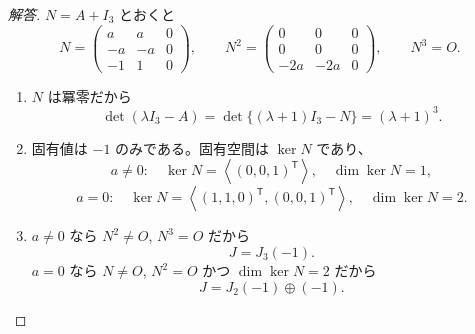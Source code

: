 \begin{proof}[解答]
$N=A+I_3$ とおくと
\[
N=\begin{pmatrix}a&a&0\\-a&-a&0\\-1&1&0\end{pmatrix},\qquad
N^2=\begin{pmatrix}0&0&0\\0&0&0\\-2a&-2a&0\end{pmatrix},\qquad
N^3=O.
\]
\begin{enumerate}
  \item[(1)] $N$ は冪零だから
  \[
  \det(\lambda I_3-A)=\det\{(\lambda+1)I_3-N\}=(\lambda+1)^3.
  \]

  \item[(2)] 固有値は $-1$ のみである。固有空間は $\ker N$ であり、
  \[
  a\ne0:\quad \ker N=\left\langle(0,0,1)^{\mathsf T}\right\rangle,
  \quad \dim\ker N=1,
  \]
  \[
  a=0:\quad
  \ker N=\left\langle(1,1,0)^{\mathsf T},(0,0,1)^{\mathsf T}\right\rangle,
  \quad \dim\ker N=2.
  \]

  \item[(3)] $a\ne0$ なら $N^2\ne O$, $N^3=O$ だから
  \[
  J=J_3(-1).
  \]
  $a=0$ なら $N\ne O$, $N^2=O$ かつ $\dim\ker N=2$ だから
  \[
  J=J_2(-1)\oplus(-1).
  \]
\end{enumerate}
\end{proof}

